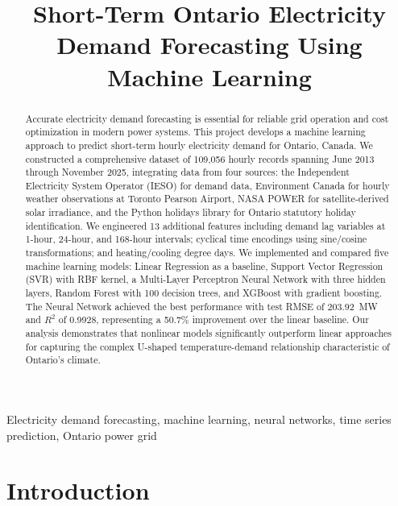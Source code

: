 \documentclass[conference]{IEEEtran}
\begin{document}
\title{Short-Term Ontario Electricity Demand Forecasting Using Machine Learning}

\author{
}

\maketitle

\begin{abstract}
Accurate electricity demand forecasting is essential for reliable grid operation and cost optimization in modern power systems. This project develops a machine learning approach to predict short-term hourly electricity demand for Ontario, Canada. We constructed a comprehensive dataset of 109,056 hourly records spanning June 2013 through November 2025, integrating data from four sources: the Independent Electricity System Operator (IESO) for demand data, Environment Canada for hourly weather observations at Toronto Pearson Airport, NASA POWER for satellite-derived solar irradiance, and the Python holidays library for Ontario statutory holiday identification. We engineered 13 additional features including demand lag variables at 1-hour, 24-hour, and 168-hour intervals; cyclical time encodings using sine/cosine transformations; and heating/cooling degree days. We implemented and compared five machine learning models: Linear Regression as a baseline, Support Vector Regression (SVR) with RBF kernel, a Multi-Layer Perceptron Neural Network with three hidden layers, Random Forest with 100 decision trees, and XGBoost with gradient boosting. The Neural Network achieved the best performance with test RMSE of 203.92~MW and $R^2$ of 0.9928, representing a 50.7\% improvement over the linear baseline. Our analysis demonstrates that nonlinear models significantly outperform linear approaches for capturing the complex U-shaped temperature-demand relationship characteristic of Ontario's climate.
\end{abstract}

\begin{IEEEkeywords}
Electricity demand forecasting, machine learning, neural networks, time series prediction, Ontario power grid
\end{IEEEkeywords}

\section{Introduction}
\end{document}
